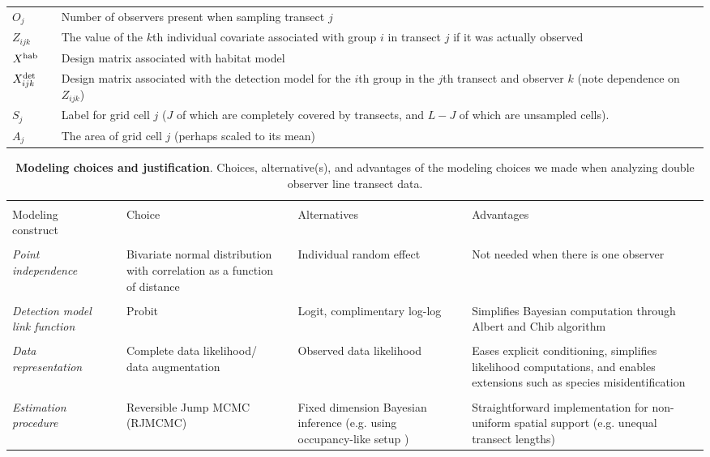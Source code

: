 \documentclass[10pt]{article}
\begin{document}
\begin{table}
\begin{tabular}{p{1.5cm}l p{12.5cm}}
$O_j$   & & Number of observers present when sampling transect $j$ \\
$Z_{ijk}$   & &  The value of the $k$th individual covariate associated with group
                $i$ in transect $j$ if it was actually observed\\
$X^{\rm hab}$   & &  Design matrix associated with habitat model\\
$X^{\rm det}_{ijk}$   & &  Design matrix associated with the detection model for the $i$th group in the $j$th transect and observer $k$ (note dependence on $Z_{ijk}$) \\
$S_j$   & & Label for grid cell $j$ ($J$ of which are completely covered by transects,
            and $L-J$ of which are unsampled cells). \\
$A_j$   & & The area of grid cell $j$ (perhaps scaled to its mean)\\
\hline
\end{tabular}
\begin{flushleft}
\end{flushleft}
\label{tab:defs}
\end{table}

\begin{table}
\caption{{\bf Modeling choices and justification}. Choices, alternative(s), and advantages of the
modeling choices we made when analyzing double observer line transect data.}
\begin{tabular}{p{3cm}l p{3cm}l p{3cm}l p{4cm}}
\hline \hline \\
Modeling construct & & Choice & & Alternatives & & Advantages \\
\hline
& & & & & & \\
{\it Point independence} & & Bivariate normal distribution with correlation as a function of distance
& & Individual random effect & & Not needed when there is one observer \\
& & & & & & \\
{\it Detection model link function} & & Probit & & Logit, complimentary log-log & & Simplifies Bayesian computation through
Albert and Chib algorithm \cite{AlbertChib1993} \\
& & & & & & \\
{\it Data representation} & & Complete data likelihood/ data augmentation & & Observed data likelihood
& & Eases explicit conditioning, simplifies likelihood computations, and enables extensions such as species misidentification\\
& & & & & & \\
{\it Estimation procedure} & & Reversible Jump MCMC (RJMCMC) & & Fixed dimension Bayesian inference (e.g. using occupancy-like setup \cite{RoyleEtAl2007})  & & Straightforward implementation for non-uniform spatial support (e.g. unequal transect lengths)\\
\hline
\end{tabular}
\label{tab:choices}
\end{table}


\end{document}
